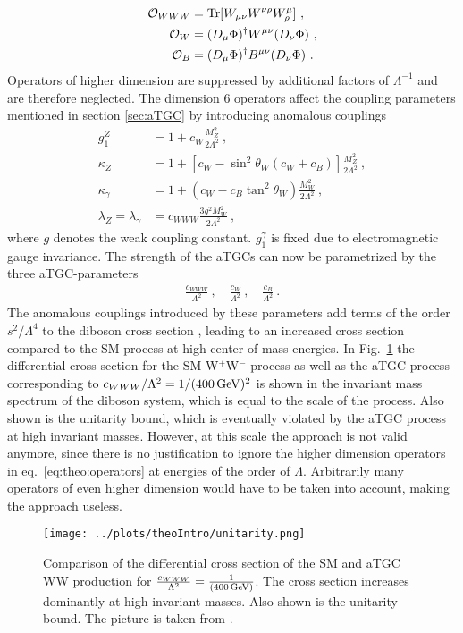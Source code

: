 \begin{align}
\mathcal{O}_{WWW} &= {\rm Tr}[W_{\mu\nu}W^{\nu\rho}W^\mu_\rho] ~, \\
\mathcal{O}_{W} &=  (D_\mu\Phi)^\dagger W^{\mu\nu}(D_\nu\Phi) ~, \\
\mathcal{O}_{B} &= (D_\mu\Phi)^\dagger B^{\mu\nu}(D_\nu\Phi) ~.
\end{align}
Operators of higher dimension are suppressed by additional factors of $\Lambda^{-1}$ and are therefore neglected. The dimension 6 operators affect the coupling parameters mentioned in section \ref{sec:aTGC} by introducing anomalous couplings
\begin{align}
g_1^Z &= 1 + c_W\frac{M_Z^2}{2\Lambda^2} ~, \\
\kappa_Z &= 1 + \left[ c_W - \sin^2\theta_W (c_W+c_B)\right] \frac{M_Z^2}{2\Lambda^2} ~, \\
\kappa_\gamma &= 1 + (c_W-c_B\tan^2\theta_W)\frac{M_W^2}{2\Lambda^2} ~, \\
\lambda_Z = \lambda_\gamma &= c_{WWW}\frac{3g^2M_W^2}{2\Lambda^2} ~, 
\end{align}
where $g$ denotes the weak coupling constant. $g_1^\gamma$ is fixed due to electromagnetic gauge invariance. The strength of the aTGCs can now be parametrized by the three aTGC-parameters
\begin{align}
\frac{c_{WWW}}{\Lambda^2} ~, \quad \frac{c_W}{\Lambda^2} ~, \quad \frac{c_B}{\Lambda^2} ~.
\end{align}
The anomalous couplings introduced by these parameters add terms of the order $s^2/\Lambda^4$ to the diboson cross section \cite{EFT}, leading to an increased cross section compared to the SM process at high center of mass energies. In Fig.~\ref{fig:theo:unitarity} the differential cross section for the SM W$^+$W$^-$ process as well as the aTGC process corresponding to $c_{WWW}/\Lambda^2 = 1/(400 \, {\rm GeV})^{2}$ is shown in the invariant mass spectrum of the diboson system, which is equal to the scale of the process. Also shown is the unitarity bound, which is eventually violated by the aTGC process at high invariant masses. However, at this scale the approach is not valid anymore, since there is no justification to ignore the higher dimension operators in eq.~\ref{eq:theo:operators} at energies of the order of $\Lambda$. Arbitrarily many operators of even higher dimension would have to be taken into account, making the approach useless.\\
\begin{figure}
	\centering
	\texttt{[image: ../plots/theoIntro/unitarity.png]}
	\caption[Comparison of the differential cross section of the SM and aTGC WW production]{Comparison of the differential cross section of the SM and aTGC WW production for $\frac{c_{WWW}}{\Lambda^2}=\frac{1}{(400\,{\rm GeV})}$. The cross section increases dominantly at high invariant masses. Also shown is the unitarity bound. The picture is taken from \cite{EFT}.}
	\label{fig:theo:unitarity}
\end{figure}

